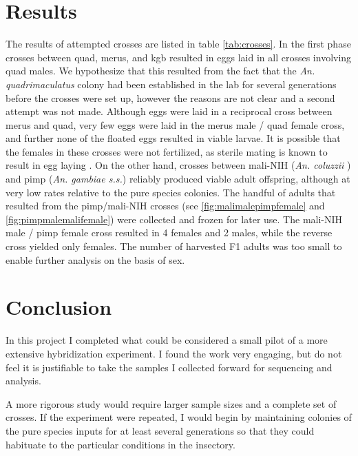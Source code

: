 \documentclass{article}
\begin{document}
\section{Results}

The results of attempted crosses are listed in table \ref{tab:crosses}. In the first phase crosses between quad, merus, and kgb resulted in eggs laid in all crosses involving quad males. We hypothesize that this resulted from the fact that the \emph{An. quadrimaculatus} colony had been established in the lab for several generations before the crosses were set up, however the reasons are not clear and a second attempt was not made. Although eggs were laid in a reciprocal cross between merus and quad, very few eggs were laid in the merus male / quad female cross, and further none of the floated eggs resulted in viable larvae. It is possible that the females in these crosses were not fertilized, as sterile mating is known to result in egg laying \cite{thailayil2011spermless}. On the other hand, crosses between mali-NIH (\emph{An. coluzzii }) and pimp (\emph{An. gambiae s.s.}) reliably produced viable adult offspring, although at very low rates relative to the pure species colonies. The handful of adults that resulted from the pimp/mali-NIH crosses (see \ref{fig:malimalepimpfemale} and \ref{fig:pimpmalemalifemale}) were collected and frozen for later use. The mali-NIH male / pimp female cross resulted in 4 females and 2 males, while the reverse cross yielded only females. The number of harvested F1 adults was too small to enable further analysis on the basis of sex.

\section{Conclusion}

In this project I completed what could be considered a small pilot of a more extensive hybridization experiment. I found the work very engaging, but do not feel it is justifiable to take the samples I collected forward for sequencing and analysis.

A more rigorous study would require larger sample sizes and a complete set of crosses. If the experiment were repeated, I would begin by maintaining colonies of the pure species inputs for at least several generations so that they could habituate to the particular conditions in the insectory.
\end{document}
